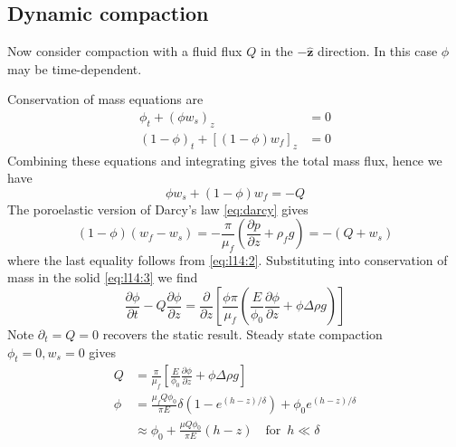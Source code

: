 \documentclass{jknotes}
\begin{document}
\subsection{Dynamic compaction}
Now consider compaction with a fluid flux $Q$ in the $-\symbf{\hat{z}}$
direction. In this case $\phi$ may be time-dependent.
\begin{center}
\end{center}
Conservation of mass equations are
\begin{align}
	\phi_t + (\phi w_s)_z &= 0 \label{eq:l14:3} \\
	(1-\phi)_t + \left[(1-\phi)w_f\right]_z &= 0
\end{align}
Combining these equations and integrating gives the total mass flux, hence we
have
\begin{equation}
	\phi w_s + (1-\phi)w_f = -Q
	\label{eq:l14:2}
\end{equation}
The poroelastic version of Darcy's law \eqref{eq:darcy} gives
\begin{equation}
	(1-\phi)(w_f - w_s) = -\frac{\pi}{\mu_f} (\frac{\partial p}{\partial z} +
	\rho_f g) = -(Q+w_s)
\end{equation}
where the last equality follows from \eqref{eq:l14:2}. Substituting into
conservation of mass in the solid \eqref{eq:l14:3} we find
\begin{equation}
	\frac{\partial \phi}{\partial t} - Q\frac{\partial \phi}{\partial z} =
	\frac{\partial}{\partial z} \left[ \frac{\phi \pi}{\mu_f} \left(
	\frac{E}{\phi_0} \frac{\partial \phi}{\partial z} + \phi \Delta \rho
	g\right) \right]
\end{equation}
Note $\partial_t = Q = 0$ recovers the static result. Steady state compaction
$\phi_t = 0, w_s = 0$ gives
\begin{align}
	Q &= \frac{\pi}{\mu_f} \left[ \frac{E}{\phi_0}\frac{\partial \phi}{\partial
	z} + \phi \Delta \rho g\right] \\
	\phi &= \frac{\mu_f Q \phi_0}{\pi E} \delta
	\left(1-e^{(h-z)/\delta}\right) + \phi_0 e^{(h-z)/\delta} \\
		 &\approx \phi_0 + \frac{\mu Q \phi_0}{\pi E} (h-z) \hspace{1em}
		 \text{for}\,\,\, h \ll \delta
\end{align}
\end{document}
